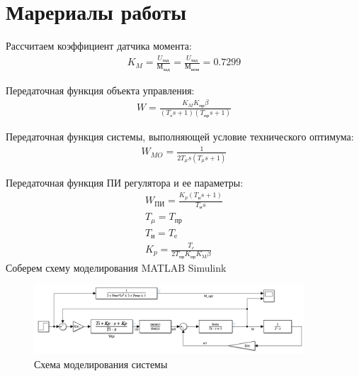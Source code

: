 \section{Марериалы работы}
Рассчитаем коэффициент датчика момента:
\begin{gather*}
    K_M = \frac{U_\text{зад}}{М_\text{зад}}= \frac{U_\text{зад}}{М_\text{ном}}= 0.7299
\end{gather*}

Передаточная функция объекта управления:
\begin{gather*}
    W = \frac{K_M K_\text{пр}\beta}{(T_\text{э}s+1)(T_\text{пр}s+1)}
\end{gather*}

Передаточная функция системы, выполняющей условие технического оптимума:
\begin{gather*}
    W_{MO} = \frac{1}{2T_\mu s(T_\mu s+1)}
\end{gather*}

Передаточная функция ПИ регулятора и ее параметры:
\begin{gather*}
    W_{\text{ПИ}} = \frac{K_p(T_\text{и} s+1)}{T_\text{и} s}\\
    T_{\mu} = T_\text{пр} \\
    T_{и} = T_\text{e}\\
    K_p = \frac{T_e}{2T_\text{пр}K_\text{пр}K_\text{M}\beta}
\end{gather*}
\newpage
Соберем схему моделирования MATLAB Simulink
\begin{figure}[!h]
    \centering
    \includegraphics[width=0.9\textwidth]{img/img}
    \caption{Схема моделирования системы}
    \label{fig:matlab}
\end{figure}

